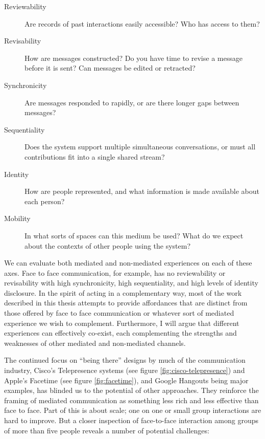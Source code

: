 \begin{description}
\item [Reviewability]{Are records of past interactions easily accessible? Who has access to them?}
\item [Revisability]{How are messages constructed? Do you have time to revise a message before it is sent? Can messages be edited or retracted?}
\item [Synchronicity]{Are messages responded to rapidly, or are there longer gaps between messages?}
\item [Sequentiality]{Does the system support multiple simultaneous conversations, or must all contributions fit into a single shared stream?}
\item [Identity]{How are people represented, and what information is made available about each person?}
\item [Mobility]{In what sorts of spaces can this medium be used? What do we expect about the contexts of other people using the system?}
\end{description}


We can evaluate both mediated and non-mediated experiences on each of these axes. Face to face communication, for example, has no reviewability or revisability with high synchronicity, high sequentiality, and high levels of identity disclosure. In the spirit of acting in a complementary way, most of the work described in this thesis attempts to provide affordances that are distinct from those offered by face to face communication or whatever sort of mediated experience we wish to complement. Furthermore, I will argue that different experiences can effectively co-exist, each complementing the strengths and weaknesses of other mediated and non-mediated channels.

The continued focus on ``being there'' designs by much of the communication industry, Cisco's Telepresence systems (see figure \ref{fig:cisco-telepresence}) and Apple's Facetime (see figure \ref{fig:facetime}), and Google Hangouts being major examples, has blinded us to the potential of other approaches. They reinforce the framing of mediated communication as something less rich and less effective than face to face. Part of this is about scale; one on one or small group interactions are hard to improve. But a closer inspection of face-to-face interaction among groups of more than five people reveals a number of potential challenges:


